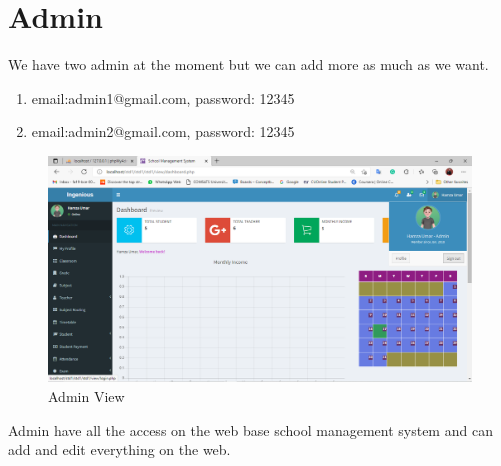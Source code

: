 \section{Admin}
We have two admin at the moment but we can add more as much as we want.
\begin{enumerate}
\item email:admin1@gmail.com, password: 12345
\item email:admin2@gmail.com, password: 12345
\end{enumerate}
\begin{figure}[H]  %
\begin{center}
\includegraphics[scale=0.45]{Chapter4/admin1}
\caption{Admin View}
\label{admin1}
\end{center}
\end{figure}
Admin have all the access on the web base school management system and can add and edit everything on the web.
